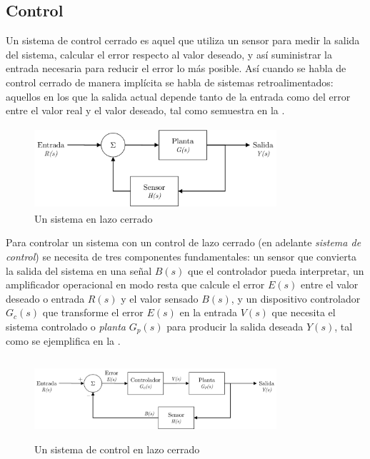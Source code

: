 %
%


\subsection{Control}%
\label{intro-control}

Un sistema de control cerrado es aquel que utiliza un sensor para medir la salida del sistema, calcular el error respecto al valor deseado, y así suministrar la entrada necesaria para reducir el error lo más posible.
Así cuando se habla de control cerrado de manera implícita se habla de sistemas retroalimentados: aquellos en los que la salida actual depende tanto de la entrada como del error entre el valor real y el valor deseado, tal como semuestra en la .

\begin{figure}[H]
	\centering
	\includegraphics[width=0.8\textwidth,height=3cm,keepaspectratio]{img/closed-loop.png}
	\caption{Un sistema en lazo cerrado}%
	\label{fig:closed-loop}
\end{figure}

Para controlar un sistema con un control de lazo cerrado (en adelante \emph{sistema de control}) se necesita de tres componentes fundamentales: un sensor que convierta la salida del sistema en una señal $B(s)$ que el controlador pueda interpretar, un amplificador operacional en modo resta que calcule el error $E(s)$ entre el valor deseado o entrada $R(s)$ y el valor sensado $B(s)$, y un dispositivo controlador $G_{c}(s)$ que transforme el error $E(s)$ en la entrada $V(s)$ que necesita el sistema controlado o \emph{planta} $G_p(s)$ para producir la salida deseada $Y(s)$, tal como se ejemplifica en la .

\begin{figure}[H]
	\centering
	\includegraphics[width=0.8\textwidth,height=3cm,keepaspectratio]{img/control-loop.png}
	\caption{Un sistema de control en lazo cerrado}%
	\label{fig:control-loop}
\end{figure}

